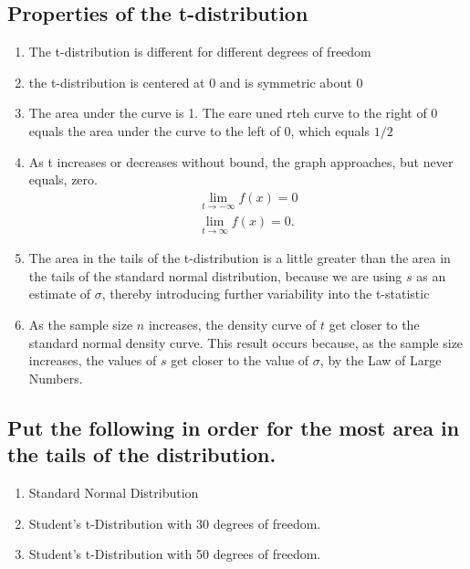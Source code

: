 \documentclass{report}
\begin{document}
   \bigbreak \noindent \bigbreak \noindent 
   \subsection*{Properties of the t-distribution}
   \bigbreak \noindent 
       \begin{enumerate}
        \item The t-distribution is different for different degrees of freedom
        \item the t-distribution is centered at 0 and is symmetric about 0 
        \item The area under the curve is 1. The eare uned rteh curve to the right of 0 equals the area under the curve to the left of 0, which equals $1/2 $
     \item As t increases or decreases without bound, the graph approaches, but never equals, zero.
         \begin{align*}
             \lim\limits_{t \to -\infty}{f(x) = 0} \\
             \lim\limits_{t \to \infty}{f(x) = 0}
         .\end{align*}
        \item The area in the tails of the t-distribution is a little greater than the area in the tails of the standard normal distribution, because we are using $s $ as an estimate of $\sigma $, thereby introducing further variability into the t-statistic
        \item As the sample size $n $ increases, the density curve of $t $ get closer to the standard normal density curve. This result occurs because, as the sample size increases, the values of $s$ get closer to the value of $\sigma $, by the Law of Large Numbers.
    \end{enumerate}

    \bigbreak \noindent \bigbreak \noindent 
    \subsection*{Put the following in order for the most area in the tails of the distribution.}
    \bigbreak \noindent 
    \begin{enumerate}[label=\alph*.)]
      \item Standard Normal Distribution
      \item Student's t-Distribution with  30 degrees of freedom.
      \item Student's t-Distribution with  50 degrees of freedom.
    \end{enumerate}
\end{document}
